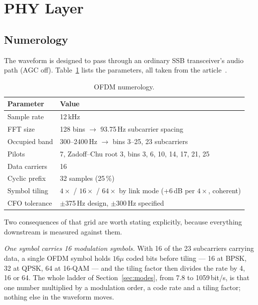 \section{PHY Layer}
\label{sec:phy}

\subsection{Numerology}

The waveform is designed to pass through an ordinary SSB transceiver's
audio path (AGC off).  Table~\ref{tab:numerology} lists the parameters,
all taken from the article~\cite{habr_ofdm}.

\begin{table}[H]
    \centering
    \caption{OFDM numerology.}
    \label{tab:numerology}
    \small
    \begin{tabular}{@{}lp{8.5cm}@{}}
    \toprule
    \textbf{Parameter} & \textbf{Value} \\
    \midrule
    Sample rate       & 12\,kHz \\
    FFT size          & 128 bins $\rightarrow$ 93.75\,Hz subcarrier spacing \\
    Occupied band     & 300--2400\,Hz $\rightarrow$ bins 3--25, 23 subcarriers \\
    Pilots            & 7, Zadoff--Chu root 3, bins 3, 6, 10, 14, 17, 21, 25 \\
    Data carriers     & 16 \\
    Cyclic prefix     & 32 samples (25\,\%) \\
    Symbol tiling     & $4\times$ / $16\times$ / $64\times$ by link mode
                        (+6\,dB per $4\times$, coherent) \\
    CFO tolerance     & $\pm$375\,Hz design, $\pm$300\,Hz specified \\
    \bottomrule
    \end{tabular}
\end{table}

Two consequences of that grid are worth stating explicitly, because
everything downstream is measured against them.

\emph{One symbol carries 16 modulation symbols.}  With 16 of the 23
subcarriers carrying data, a single OFDM symbol holds $16\mu$ coded
bits before tiling --- 16 at BPSK, 32 at QPSK, 64 at 16-QAM --- and the
tiling factor then divides the rate by 4, 16 or 64.  The whole ladder
of Section~\ref{sec:modes}, from 7.8 to 1059\,bit/s, is that one
number multiplied by a modulation order, a code rate and a tiling
factor; nothing else in the waveform moves.

